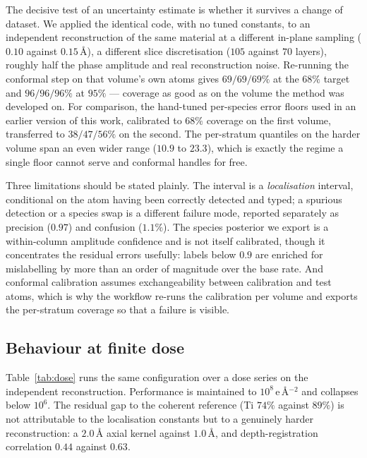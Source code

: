 \documentclass[aps,prb,twocolumn,superscriptaddress,floatfix,nofootinbib]{revtex4-2}
\begin{document}
The decisive test of an uncertainty estimate is whether it survives a change of dataset. We
applied the identical code, with no tuned constants, to an independent reconstruction of the
same material at a different in-plane sampling ($0.10$ against $0.15$\,\AA), a different slice
discretisation ($105$ against $70$ layers), roughly half the phase amplitude and real
reconstruction noise. Re-running the conformal step on that volume's own atoms gives
$69/69/69\%$ at the $68\%$ target and $96/96/96\%$ at $95\%$ --- coverage as good as on the
volume the method was developed on. For comparison, the hand-tuned per-species error floors used
in an earlier version of this work, calibrated to $68\%$ coverage on the first volume,
transferred to $38/47/56\%$ on the second. The per-stratum quantiles on the harder volume span
an even wider range ($10.9$ to $23.3$), which is exactly the regime a single floor cannot serve
and conformal handles for free.

Three limitations should be stated plainly. The interval is a \emph{localisation} interval,
conditional on the atom having been correctly detected and typed; a spurious detection or a
species swap is a different failure mode, reported separately as precision ($0.97$) and
confusion ($1.1\%$). The species posterior we export is a within-column amplitude confidence and
is not itself calibrated, though it concentrates the residual errors usefully: labels below
$0.9$ are enriched for mislabelling by more than an order of magnitude over the base rate.
And conformal calibration assumes exchangeability between calibration and test atoms, which is
why the workflow re-runs the calibration per volume and exports the per-stratum coverage so
that a failure is visible.

\subsection{Behaviour at finite dose}
\label{sec:dose}

Table~\ref{tab:dose} runs the same configuration over a dose series on the independent
reconstruction. Performance is maintained to $10^{8}$\,e\,\AA$^{-2}$ and collapses below
$10^{6}$. The residual gap to the coherent reference (Ti $74\%$ against $89\%$) is not
attributable to the localisation constants but to a genuinely harder reconstruction: a
$2.0$\,\AA{} axial kernel against $1.0$\,\AA, and depth-registration correlation $0.44$
against $0.63$.
\end{document}

